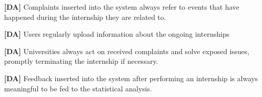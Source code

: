    \textbf{[DA\cda]} Complaints inserted into the system always refer to events that have happened during the internship they are related to.

    \textbf{[DA\cda]} Users regularly upload information about the ongoing internships

    \textbf{[DA\cda]} Universities always act on received complaints and solve exposed issues, promptly terminating the internship if necessary.

    \textbf{[DA\cda]} Feedback inserted into the system after performing an internship is always meaningful to be fed to the statistical analysis.    

\begin{center}
\end{center}